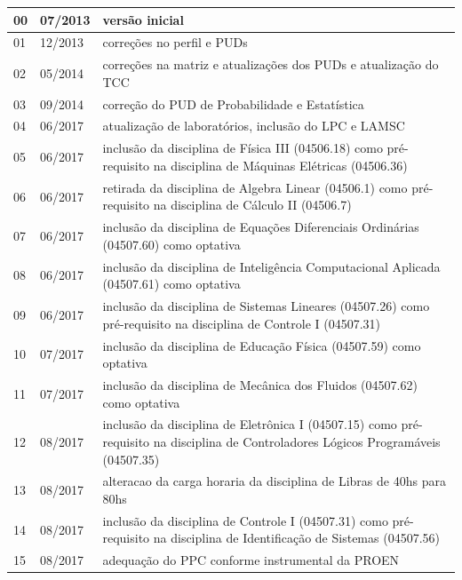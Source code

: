 \begin{center}
\begin{longtable}{lp{2cm}p{11cm}}
		
		00 & 07/2013 & versão inicial\\ \hline
		01 & 12/2013 & correções no perfil e PUDs\\ \hline
		02 & 05/2014 & correções na matriz e atualizações dos PUDs e atualização do TCC\\ \hline
		03 & 09/2014 & correção do PUD de Probabilidade e Estatística\\ \hline
		04 & 06/2017 & atualização de laboratórios, inclusão do LPC e LAMSC\\ \hline
		05 & 06/2017 & inclusão da disciplina de Física III (04506.18) como pré-requisito na disciplina de Máquinas Elétricas (04506.36)\\ \hline
		06 & 06/2017 & retirada da disciplina de Algebra Linear (04506.1) como pré-requisito na disciplina de Cálculo II (04506.7)\\ \hline
		07 & 06/2017 & inclusão da disciplina de Equações Diferenciais Ordinárias (04507.60) como optativa\\ \hline
		08 & 06/2017 & inclusão da disciplina de Inteligência Computacional Aplicada (04507.61) como optativa\\ \hline
		09 & 06/2017 & inclusão da disciplina de Sistemas Lineares (04507.26) como pré-requisito na disciplina de Controle I (04507.31)\\ \hline
		10 & 07/2017 & inclusão da disciplina de Educação Física (04507.59) como optativa\\ \hline
		11 & 07/2017 & inclusão da disciplina de Mecânica dos Fluidos (04507.62) como optativa\\ \hline
		12 & 08/2017 & inclusão da disciplina de Eletrônica I (04507.15) como pré-requisito na disciplina de Controladores Lógicos Programáveis (04507.35)\\ \hline
		13 & 08/2017 & alteracao da carga horaria da disciplina de Libras de 40hs para 80hs\\ \hline
		14 & 08/2017 & inclusão da disciplina de Controle I (04507.31) como pré-requisito na disciplina de Identificação de Sistemas (04507.56)\\ \hline
		15 & 08/2017 & adequação do PPC conforme instrumental da PROEN\\ \hline

\end{longtable}
\end{center}
